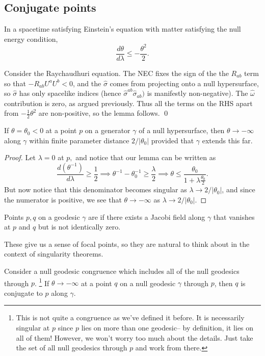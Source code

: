 \subsection*{Conjugate points}
\begin{lem}
In a spacetime satisfying Einstein's equation with matter satisfying the null energy condition,
\begin{equation}
    \frac{d\theta}{d\lambda}\leq -\frac{\theta^2}{2}.
\end{equation}
\end{lem}
Consider the Raychaudhuri equation. The NEC fixes the sign of the the $R_{ab}$ term so that $-R_{ab}U^a U^b < 0$, and the $\hat \sigma$ comes from projecting onto a null hypersurface, so $\hat\sigma$ has only spacelike indices (hence $\hat\sigma^{ab} \hat \sigma_{ab})$ is manifestly non-negative). The $\hat \omega$ contribution is zero, as argued previously. Thus all the terms on the RHS apart from $-\frac{1}{2}\theta^2$ are non-positive, so the lemma follows. \qed
\begin{cor}
    If $\theta=\theta_0 <0$ at a point $p$ on a generator $\gamma$ of a null hypersurface, then $\theta \to -\infty$ along $\gamma$ within finite parameter distance $2/|\theta_0|$  provided that $\gamma$ extends this far.
\end{cor}
\begin{proof}
    Let $\lambda=0$ at $p,$ and notice that our lemma can be written as
    \begin{equation}
        \frac{d(\theta^{-1})}{d\lambda} \geq \frac{1}{2} \implies \theta^{-1} -\theta_0^{-1}\geq \frac{\lambda}{2}\implies \theta \leq \frac{\theta_0}{1+\lambda\frac{\theta_0}{2}}.
    \end{equation}
    But now notice that this denominator becomes singular as $\lambda \to 2/|\theta_0|$, and since the numerator is positive, we see that $\theta\to -\infty$ as $\lambda\to 2/|\theta_0|$.
\end{proof}
\begin{defn}
    Points $p,q$ on a geodesic $\gamma$ are  if there exists a Jacobi field along $\gamma$ that vanishes at $p$ and $q$ but is not identically zero.
\end{defn}
These give us a sense of focal points, so they are natural to think about in the context of singularity theorems.
\begin{thm}\label{conjugatepoints}
    Consider a null geodesic congruence which includes all of the null geodesics through $p$.%
        \footnote{This is not quite a congruence as we've defined it before. It is necessarily singular at $p$ since $p$ lies on more than one geodesic-- by definition, it lies on all of them! However, we won't worry too much about the details. Just take the set of all null geodesics through $p$ and work from there.}
    If $\theta \to -\infty$ at a point $q$ on a null geodesic $\gamma$ through $p$, then $q$ is conjugate to $p$ along $\gamma$.
\end{thm}
